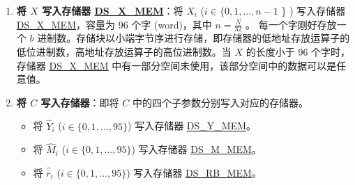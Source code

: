 \documentclass[main\_\_CN.tex]{subfiles}
\begin{document}
\begin{enumerate}
    \item {\bfseries 将 \begin{math}X\end{math} 写入存储器 \hyperref[DSXMEM]{DS\_X\_MEM}}：将 \begin{math}X_{i}\end{math}
        (\begin{math}i \in \{ 0, 1, \dots, n-1 \end{math} \} )
        写入存储器 \hyperref[DSXMEM]{DS\_X\_MEM}，容量为 96 个字 (word)，其中 \begin{math} n = \frac{N}{32} \end{math} 。
        每一个字刚好存放一个 \begin{math}b\end{math} 进制数。存储块以小端字节序进行存储，即存储器的低地址存放运算子的低位进制数，高地址存放运算子的高位进制数。当 \begin{math}X\end{math} 的长度小于 96 个字时，存储器 \hyperref[DSXMEM]{DS\_X\_MEM} 中有一部分空间未使用，该部分空间中的数据可以是任意值。
        
    \item {\bfseries 将 \begin{math}C\end{math} 写入存储器}：即将 \begin{math}C\end{math} 中的四个子参数分别写入对应的存储器。
    \begin{itemize}
        
        \item 将 \begin{math}\widehat{Y}_{i}\end{math}
        (\begin{math}i \in \{ 0, 1, \dots, 95 \} \end{math})
        写入存储器 \hyperref[DSYMEM]{DS\_Y\_MEM}。
        
        \item 将 \begin{math}\widehat{M}_{i}\end{math}
        (\begin{math}i \in \{ 0, 1, \dots, 95 \} \end{math})
        写入存储器 \hyperref[DSMMEM]{DS\_M\_MEM}。
        
        \item 将 \begin{math}\widehat{\overline{r}}_{i}\end{math}
        (\begin{math}i \in \{ 0, 1, \dots, 95 \} \end{math})
        写入存储器 \hyperref[DSRBMEM]{DS\_RB\_MEM}。
        

\end{itemize}
\end{enumerate}
\end{document}
